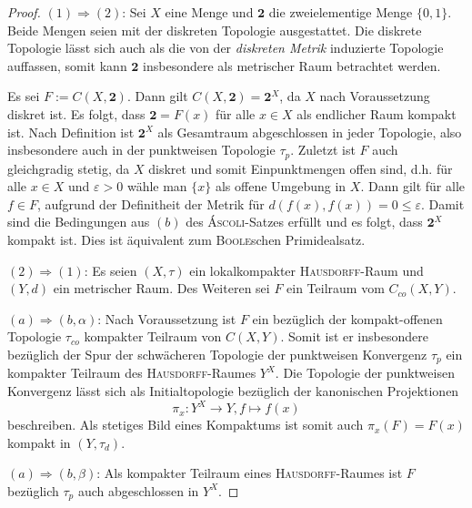 \begin{proof}
  $(1) \Rightarrow (2)$: Sei $X$ eine Menge und $\mathbf{2}$ die zweielementige Menge $\{0,1\}$. Beide Mengen seien  mit der diskreten Topologie ausgestattet. 
  Die diskrete Topologie lässt sich auch als die von der \textit{diskreten Metrik} induzierte Topologie auffassen, somit kann $\mathbf{2}$ insbesondere als metrischer Raum betrachtet werden. 

  Es sei $F := C(X, \mathbf{2})$.
  Dann gilt $C(X, \mathbf{2}) = \mathbf{2}^X$, da $X$ nach Voraussetzung diskret ist.
  Es folgt, dass $\mathbf{2} = F(x)$ für alle $x \in X$ als endlicher Raum kompakt ist.
  Nach Definition ist $\mathbf{2}^X$ als Gesamtraum abgeschlossen in jeder Topologie, also insbesondere auch in der punktweisen Topologie $\tau_p$.
  Zuletzt ist $F$ auch gleichgradig stetig, da $X$ diskret und somit Einpunktmengen offen sind, d.h. für alle $x \in X$ und $\varepsilon > 0$ wähle man $\{x\}$ als offene Umgebung in $X$. 
  Dann gilt für alle $f \in F$, aufgrund der Definitheit der Metrik für  $d(f(x),f(x)) = 0 \leq \varepsilon$.
  Damit sind die Bedingungen aus $(b)$ des \textsc{Áscoli}-Satzes erfüllt und es folgt, dass $\mathbf{2}^X$ kompakt ist. 
  Dies ist äquivalent zum \textsc{Boole}schen Primidealsatz.

  $(2) \Rightarrow (1)$: Es seien $(X,\tau)$ ein lokalkompakter \textsc{Hausdorff}-Raum und $(Y,d)$ ein metrischer Raum.
  Des Weiteren sei $F$ ein Teilraum vom $C_{co}(X,Y)$.

  $(a) \Rightarrow (b, \alpha)$: 
  Nach Voraussetzung ist $F$ ein bezüglich der kompakt-offenen Topologie $\tau_{co}$ kompakter Teilraum von $C(X,Y)$.
  Somit ist er insbesondere bezüglich der Spur der schwächeren Topologie der punktweisen Konvergenz $\tau_p$ ein kompakter Teilraum des \textsc{Hausdorff}-Raumes $Y^X$.
  Die Topologie der punktweisen Konvergenz lässt sich als Initialtopologie bezüglich der kanonischen Projektionen 
  \begin{displaymath}
    \pi_x : Y^X \to Y, f \mapsto f(x)
  \end{displaymath}
  beschreiben.
  Als stetiges Bild eines Kompaktums ist somit auch $\pi_x(F) = F(x)$ kompakt in $(Y,\tau_d)$.

  $(a) \Rightarrow (b, \beta)$:  
  Als kompakter Teilraum eines \textsc{Hausdorff}-Raumes ist $F$ bezüglich $\tau_p$ auch abgeschlossen in $Y^X$.


\end{proof}
